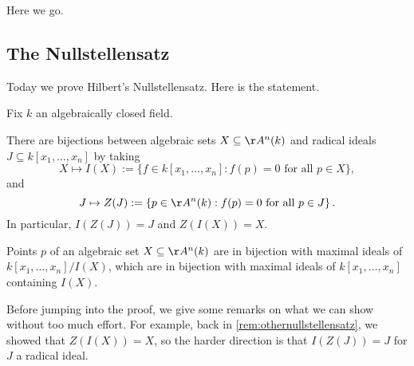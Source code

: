 
Here we go.

\subsection{The Nullstellensatz}
Today we prove Hilbert's Nullstellensatz. Here is the statement.
\begin{theorem}[Nullstellensatz] \label{thm:nullstellensatz}
	Fix $k$ an algebraically closed field.
	\begin{listalph}
		\item There are bijections between algebraic sets $X\subseteq\AA^n(k)$ and radical ideals $J\subseteq k[x_1,\ldots,x_n]$ by taking
		\[X\mapsto I(X):=\{f\in k[x_1,\ldots,x_n]:f(p)=0\text{ for all }p\in X\},\]
		and
		\[J\mapsto Z(J):=\left\{p\in\AA^n(k):f(p)=0\text{ for all }p\in J\right\}.\]
		In particular, $I(Z(J))=J$ and $Z(I(X))=X$.
		\item Points $p$ of an algebraic set $X\subseteq\AA^n(k)$ are in bijection with maximal ideals of $k[x_1,\ldots,x_n]/I(X)$, which are in bijection with maximal ideals of $k[x_1,\ldots,x_n]$ containing $I(X)$.
	\end{listalph}
\end{theorem}
Before jumping into the proof, we give some remarks on what we can show without too much effort. For example, back in \autoref{rem:othernullstellensatz}, we showed that $Z(I(X))=X$, so the harder direction is that $I(Z(J))=J$ for $J$ a radical ideal.

